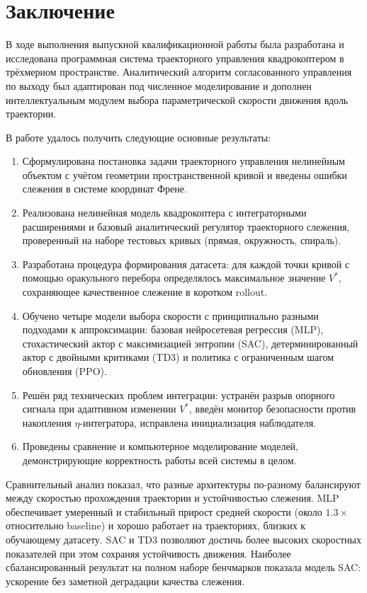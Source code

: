 \chapter*{Заключение}

В ходе выполнения выпускной квалификационной работы была разработана и исследована программная система траекторного управления квадрокоптером в трёхмерном пространстве. Аналитический алгоритм согласованного управления по выходу был адаптирован под численное моделирование и дополнен интеллектуальным модулем выбора параметрической скорости движения вдоль траектории.

В работе удалось получить следующие основные результаты:
\begin{enumerate}
    \item Сформулирована постановка задачи траекторного управления нелинейным объектом с учётом геометрии пространственной кривой и введены ошибки слежения в системе координат Френе.
    \item Реализована нелинейная модель квадрокоптера с интеграторными расширениями и базовый аналитический регулятор траекторного слежения, проверенный на наборе тестовых кривых (прямая, окружность, спираль).
    \item Разработана процедура формирования датасета: для каждой точки кривой с помощью оракульного перебора определялось максимальное значение $V^{\ast}$, сохраняющее качественное слежение в коротком rollout.
    \item Обучено четыре модели выбора скорости с принципиально разными подходами к аппроксимации: базовая нейросетевая регрессия (MLP), стохастический актор с максимизацией энтропии (SAC), детерминированный актор с двойными критиками (TD3) и политика с ограниченным шагом обновления (PPO).
    \item Решён ряд технических проблем интеграции: устранён разрыв опорного сигнала при адаптивном изменении $V^{\ast}$, введён монитор безопасности против накопления $\eta$-интегратора, исправлена инициализация наблюдателя.
    \item Проведены сравнение и компьютерное моделирование моделей, демонстрирующие корректность работы всей системы в целом.
\end{enumerate}

Сравнительный анализ показал, что разные архитектуры по-разному балансируют между скоростью прохождения траектории и устойчивостью слежения.
MLP обеспечивает умеренный и стабильный прирост средней скорости (около $1.3\times$ относительно baseline) и хорошо работает на траекториях, близких к обучающему датасету.
SAC и TD3 позволяют достичь более высоких скоростных показателей при этом сохраняя устойчивость движения.
Наиболее сбалансированный результат на полном наборе бенчмарков показала модель SAC: ускорение без заметной деградации качества слежения.

